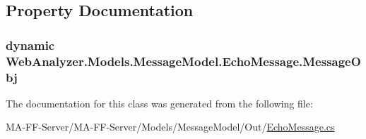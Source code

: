 \subsection{Property Documentation}
\hypertarget{class_web_analyzer_1_1_models_1_1_message_model_1_1_echo_message_a547379308602e0e2a8af2a9790d3e9a4}{}
\subsubsection[{Message\+Obj}]{\setlength{\rightskip}{0pt plus 5cm}dynamic Web\+Analyzer.\+Models.\+Message\+Model.\+Echo\+Message.\+Message\+Obj\hspace{0.3cm}{\ttfamily [get]}}\label{class_web_analyzer_1_1_models_1_1_message_model_1_1_echo_message_a547379308602e0e2a8af2a9790d3e9a4}


The documentation for this class was generated from the following file\+:\begin{DoxyCompactItemize}
\item 
M\+A-\/\+F\+F-\/\+Server/\+M\+A-\/\+F\+F-\/\+Server/\+Models/\+Message\+Model/\+Out/\hyperlink{_echo_message_8cs}{Echo\+Message.\+cs}\end{DoxyCompactItemize}
